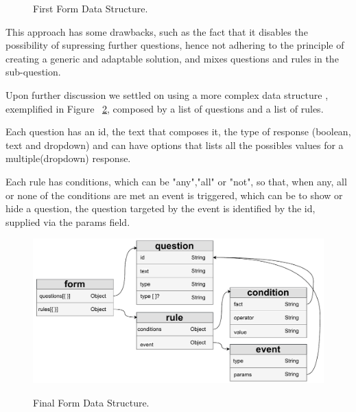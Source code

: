 \begin{figure}[hbt!]
	\begin{center}
	\end{center}
	\caption{First Form Data Structure.}\label{fig:old_form}
\end{figure}

This approach has some drawbacks, such as the fact that it disables the possibility of supressing further questions, hence not adhering to the principle of creating a generic and adaptable solution, and mixes questions and rules in the sub-question.

Upon further discussion we settled on using a more complex data structure , exemplified in Figure ~\ref{fig:new_form}, composed by a list of questions and a list of rules.

Each question has an id, the text that composes it, the type of response (boolean, text and dropdown) and can have options that lists all the possibles values for a multiple(dropdown) response.

Each rule has conditions, which can be "any","all" or "not", so that, when any, all or none of the conditions are met an event is triggered, which can be to show or hide a question, the question targeted by the event is identified by the id, supplied via the params field.


\begin{figure}[htbp]
	\begin{center}
		{\includegraphics[width=\textwidth,height=\textheight,keepaspectratio]{./figures/newForm.pdf}}
	\end{center}
	\caption{Final Form Data Structure.}\label{fig:new_form}
\end{figure}
\FloatBarrier


